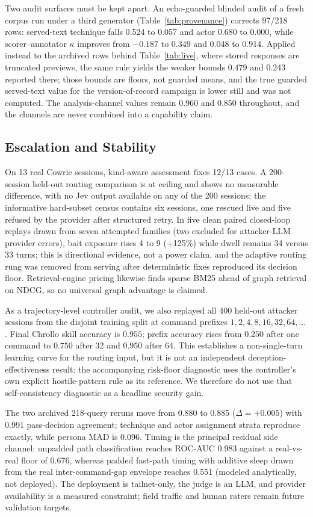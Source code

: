 Two audit surfaces must be kept apart. An echo-guarded blinded audit of a
fresh corpus run under a third generator
(Table~\ref{tab:provenance}) corrects 97/218 rows: served-text technique
falls 0.524 to 0.057 and actor 0.680 to 0.000, while scorer--annotator
$\kappa$ improves from $-0.187$ to 0.349 and 0.048 to 0.914. Applied instead
to the archived rows behind Table~\ref{tab:live}, where stored responses are
truncated previews, the same rule yields the weaker bounds 0.479 and 0.243
reported there; those bounds are floors, not guarded means, and the true
guarded served-text value for the version-of-record campaign is lower still
and was not computed. The analysis-channel values remain 0.960 and 0.850
throughout, and the channels are never combined into a capability claim.

\subsection{Escalation and Stability}
\label{sec:jeveval}
On 13 real Cowrie sessions, kind-aware assessment fixes 12/13 cases. A
200-session held-out routing comparison is at ceiling and shows no measurable
difference, with no Jev output available on any of the 200 sessions; the
informative hard-subset census contains six sessions, one rescued live and
five refused by the provider after structured retry. In five clean paired closed-loop
replays drawn from seven attempted families (two excluded for attacker-LLM
provider errors), bait exposure rises 4 to 9 (+125\%) while dwell remains
34 versus
33 turns; this is directional evidence, not a power claim, and the adaptive
routing rung was removed from serving after deterministic fixes reproduced
its decision floor. Retrieval-engine pricing likewise finds sparse BM25
ahead of graph retrieval on NDCG, so no universal graph advantage is claimed.

As a trajectory-level controller audit, we also replayed all 400 held-out
attacker sessions from the disjoint training split at command prefixes
${1,2,4,8,16,32,64,\ldots}$. Final Chrollo skill accuracy is $0.955$; prefix
accuracy rises from $0.250$ after one command to $0.750$ after 32 and
$0.950$ after 64. This establishes a non-single-turn learning curve for the
routing input, but it is not an independent deception-effectiveness result:
the accompanying risk-floor diagnostic uses the controller's own explicit
hostile-pattern rule as its reference. We therefore do not use that
self-consistency diagnostic as a headline security gain.

The two archived 218-query reruns move from 0.880 to 0.885
($\Delta=+0.005$) with 0.991 pass-decision agreement; technique and actor
assignment strata reproduce exactly, while persona MAD is 0.096. Timing is
the principal residual side channel: unpadded path classification reaches
ROC-AUC 0.983 against a real-vs-real floor of 0.676, whereas padded fast-path
timing with additive sleep drawn from the real inter-command-gap envelope
reaches 0.551 (modeled analytically, not deployed). The deployment is
tailnet-only, the judge is an LLM,
and provider availability is a measured constraint; field traffic and human
raters remain future validation targets.
